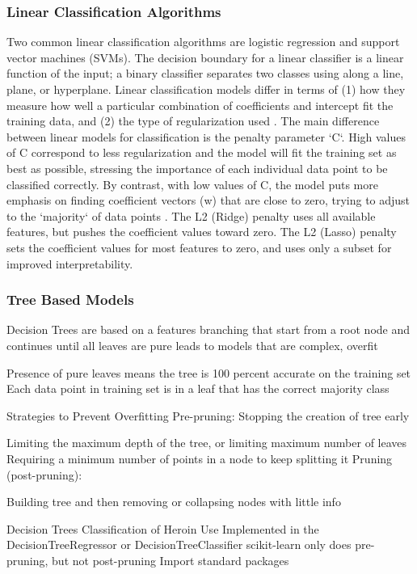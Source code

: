 \documentclass[sigconf]{acmart}
\begin{document}
\subsubsection{Linear Classification Algorithms}
Two common linear classification algorithms are logistic regression and support 
vector machines (SVMs). The decision boundary for a linear classifier is a 
linear function of the input; a binary classifier separates two classes using 
along a line, plane, or hyperplane. Linear classification models differ in 
terms of (1) how they measure how well a particular combination of coefficients 
and intercept fit the training data, and (2) the type of regularization used 
\cite{muller17}. The main difference between linear models for classification 
is the penalty parameter `C`. High values of C correspond to less regularization
and the model will fit the training set as best as possible, stressing the 
importance of each individual data point to be classified correctly. By 
contrast, with low values of C, the model puts more emphasis on finding 
coefficient vectors (w) that are close to zero, trying to adjust to the 
`majority` of data points \cite{muller17}. The L2 (Ridge) penalty uses all 
available features, but pushes the coefficient values toward zero. The L2 
(Lasso) penalty sets the coefficient values for most features to zero, and 
uses only a subset for improved interpretability.

\subsubsection{Tree Based Models}

Decision Trees are based on a features branching that start from a root node
and continues until all leaves are pure leads to models that are complex, overfit

Presence of pure leaves means the tree is 100 percent accurate on the training set
Each data point in training set is in a leaf that has the correct majority class

Strategies to Prevent Overfitting
Pre-pruning:
Stopping the creation of tree early

Limiting the maximum depth of the tree, or limiting maximum number of leaves
Requiring a minimum number of points in a node to keep splitting it
Pruning (post-pruning):

Building tree and then removing or collapsing nodes with little info

Decision Trees Classification of Heroin Use
Implemented in the DecisionTreeRegressor or DecisionTreeClassifier
scikit-learn only does pre-pruning, but not post-pruning
Import standard packages
\end{document}
